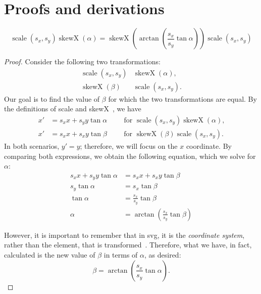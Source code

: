 \chapter{Proofs and derivations}\label{appx:proofs-and-derivations}

\begin{theorem}
     \[
    \operatorname{scale}\left(s_x, s_y\right)\operatorname{skewX}(\alpha) = \operatorname{skewX}\left(\arctan\left(\frac{s_x}{s_y} \tan{\alpha}\right)\right)\operatorname{scale}\left(s_x, s_y\right)
     \]
\end{theorem}
\begin{proof}
   Consider the following two transformations:
    \begin{align}
        \operatorname{scale}\left(s_x, s_y\right)&\operatorname{skewX}(\alpha)\text{,} \\
        \operatorname{skewX}\left(\beta\right)&\operatorname{scale}\left(s_x, s_y\right)\text{.}
    \end{align}
    Our goal is to find the value of $\beta$ for which the two transformations are equal. By the definitions of scale and skewX~\cite[Sec.~7.4]{svg11}, we have
    \begin{align}
        x' &= s_xx + s_yy\tan{\alpha}\hspace{1cm}\text{for }\operatorname{scale}\left(s_x, s_y\right)\operatorname{skewX}(\alpha)\text{,} \\
        x' &= s_xx + s_xy\tan{\beta}\hspace{1cm}\text{for }\operatorname{skewX}\left(\beta\right)\operatorname{scale}\left(s_x, s_y\right)\text{.}
    \end{align}
    In both scenarios, $y' = y$; therefore, we will focus on the $x$ coordinate. By comparing both expressions, we obtain the following equation, which we solve for $\alpha$:
    \begin{align}
        s_xx + s_yy\tan{\alpha} &= s_xx + s_xy\tan{\beta} \\
        s_y\tan{\alpha} &= s_x\tan{\beta} \\
        \tan{\alpha} &= \frac{s_x}{s_y}\tan{\beta} \\
        \alpha &= \arctan{\left(\frac{s_x}{s_y}\tan{\beta}\right)}
    \end{align}

    However, it is important to remember that in \gls{svg}, it is the \emph{coordinate system}, rather than the element, that is transformed~\cite[Sec.~7.4]{svg11}. Therefore, what we have, in fact, calculated is the new value of $\beta$ in terms of $\alpha$, as desired:
    \[
        \beta = \arctan{\left(\frac{s_x}{s_y}\tan{\alpha}\right)}\text{.}
    \]
\end{proof}

